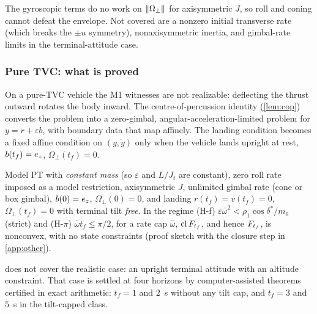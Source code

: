 The gyroscopic terms do no work on $\lVert \Omega_\perp\rVert$ for axisymmetric $J$, so roll and coning cannot defeat the
envelope. Not covered are a nonzero initial transverse rate (which breaks the $\pm u$ symmetry), nonaxisymmetric
inertia, and gimbal-rate limits in the terminal-attitude case.

\subsubsection{Pure TVC: what is proved}\label{sec:tvc}
On a pure-TVC vehicle the M1 witnesses are not realizable: deflecting the thrust outward rotates the body inward.
The centre-of-percussion identity (\cref{lem:cop}) converts the problem into a zero-gimbal, angular-acceleration-limited
problem for $y=r+\varepsilon b$, with boundary data that map affinely. The landing condition becomes a fixed affine
condition on $(y,\dot y)$ only when the vehicle lands upright at rest, $b(t_f)=e_z$, $\Omega_\perp(t_f)=0$.

\begin{theorem}\label{thm:E0}
Model PT with \emph{constant mass} (so $\varepsilon$ and $L/J_t$ are constant), zero roll rate imposed as a model restriction,
axisymmetric $J$, unlimited gimbal rate (cone or box gimbal),
$b(0)=e_z$, $\Omega_\perp(0)=0$, and landing $r(t_f)=v(t_f)=0$, $\Omega_\perp(t_f)=0$ with terminal tilt \emph{free}. In the
regime (H-f) $\varepsilon\bar\omega^2<\rho_1\cos\delta^*/m_0$ (strict) and (H-$\pi$) $\bar\omega t_f\le\pi/2$, for a rate cap $\bar\omega$,
$\operatorname{cl}F_{t_f}$, and hence $F_{t_f}$, is nonconvex, with no state constraints (proof sketch with the closure step in \cref{app:other}).\Srep
\end{theorem}
 does not cover the realistic case: an upright terminal attitude with an altitude constraint. That case is
settled at four horizons by computer-assisted theorems certified in exact arithmetic: $t_f=1$ and $2$~s without any tilt cap, and
$t_f=3$ and $5$~s in the tilt-capped class.

